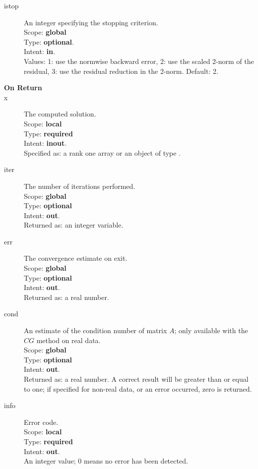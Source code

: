 \begin{description}
\item[istop]  An integer specifying the stopping criterion.\\
Scope: {\bf global} \\
Type: {\bf optional}.\\
Intent: {\bf in}.\\
Values: 1: use the normwise backward error, 2: use the scaled 2-norm
of the residual, 3: use the residual reduction in the 2-norm. Default: 2. 
\item[\bf On Return] 
\item[x] The computed solution. \\
Scope: {\bf local} \\
Type: {\bf required}\\
Intent: {\bf inout}.\\
Specified as:  a rank one array or an object of type \vdata.
\item[iter]  The number of iterations performed.\\
Scope: {\bf global} \\
Type: {\bf optional}\\
Intent: {\bf out}.\\
Returned  as: an integer variable.
\item[err]  The convergence estimate on exit.\\
Scope: {\bf global} \\
Type: {\bf optional}\\
Intent: {\bf out}.\\
Returned  as: a real number.
\item[cond]  An estimate of the condition number of matrix $A$; only
  available with the $CG$ method on real data.\\
Scope: {\bf global} \\
Type: {\bf optional}\\
Intent: {\bf out}.\\
Returned  as: a real number. A correct result will be greater than or
equal to one; if specified for non-real data, or an error occurred,
zero is returned.
\item[info] Error code.\\
Scope: {\bf local} \\
Type: {\bf required} \\
Intent: {\bf out}.\\
An integer value; 0 means no error has been detected. 
\end{description}


%
%

